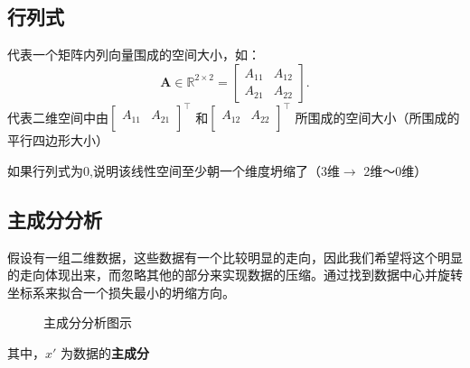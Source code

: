 \subsection{行列式}%
\label{sub:行列式}
代表一个矩阵内列向量围成的空间大小，如：\[
    \bm{A}\in \mathbb{R}^{2\times 2} = \begin{bmatrix}
        A_{11} & A_{12}\\
        A_{21} & A_{22}
    \end{bmatrix}
.\]
代表二维空间中由$\begin{bmatrix}
    A_{11} & A_{21}\\
\end{bmatrix}^\top $ 和$\begin{bmatrix}
    A_{12} & A_{22}\\
\end{bmatrix}^\top $ 所围成的空间大小（所围成的平行四边形大小）
\begin{notation}
    如果行列式为0,说明该线性空间至少朝一个维度坍缩了（3维$\to $ 2维～0维）
\end{notation}
\subsection{主成分分析}%
\label{sub:主成分分析}
假设有一组二维数据，这些数据有一个比较明显的走向，因此我们希望将这个明显的走向体现出来，而忽略其他的部分来实现数据的压缩。通过找到数据中心并旋转坐标系来拟合一个损失最小的坍缩方向。
\begin{figure}[ht!]
    \centering
    \caption{主成分分析图示}
    \label{fig:主成分分析图示}
\end{figure}

其中，$x'$ 为数据的\textbf{主成分}
